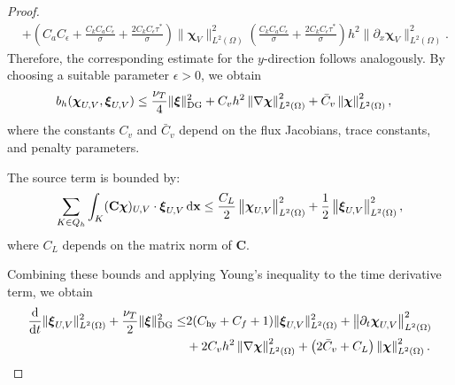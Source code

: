 \documentclass[pdflatex,sn-mathphys-num]{sn-jnl}%
\theoremstyle{thmstyleone}%
\theoremstyle{thmstyletwo}%
\theoremstyle{thmstylethree}%
\begin{document}
\begin{proof}
\begin{equation}
\begin{aligned}
& + \left( C_a C_\epsilon + \frac{C_k C_aC_\epsilon}{\sigma}+ \frac{2C_k C_\epsilon \tau^*}{\sigma}\right) \|\boldsymbol{\chi}_{V}\|_{L^2(\Omega)}^2 \left(\frac{C_k C_aC_\epsilon}{\sigma}+ \frac{2C_kC_\epsilon \tau^*}{\sigma} \right) h^2\|\partial_x \boldsymbol{\chi}_{V}\|_{L^2(\Omega)}^2.
\end{aligned}
\end{equation}
Therefore, the corresponding estimate for the $y$-direction follows analogously. By choosing a suitable parameter $\epsilon > 0$, we obtain
\begin{equation}\notag
\begin{aligned}
b_h(\boldsymbol{\chi}_{U,V}, \boldsymbol{\xi}_{U,V})
&\le \frac{\nu_T}{4} \|\boldsymbol{\xi}\|_{\mathrm{DG}}^2  + C_v h^{2}
\left\|\nabla \boldsymbol{\chi} \right\|^2_{L^2(\Omega)} + \bar{C}_v 
\left\|\boldsymbol{\chi} \right\|^2_{L^2(\Omega)},
\end{aligned}
\end{equation}
where the constants $C_v$ and $\bar{C}_v$ depend on the flux Jacobians, trace constants, and penalty parameters.

The source term is bounded by:
\begin{equation}\notag
\begin{aligned}
  \sum_{K \in Q_h} \int_K (\mathbf{C}\boldsymbol{\chi})_{U,V} \cdot \boldsymbol{\xi}_{U,V} \, \mathrm{d} \mathbf{x} \le \frac{C_L}{2}\left\|\boldsymbol{\chi}_{U,V}\right\|_{L^2(\Omega)}^2 + \frac{1}{2}\left\|\boldsymbol{\xi}_{U,V}\right\|_{L^2(\Omega)}^2,
\end{aligned}
\end{equation}
where $C_{L}$ depends on the matrix norm of $\mathbf{C}$.

Combining these bounds and applying Young's inequality to the time derivative term, we obtain
\begin{equation}\notag
\begin{aligned}
\frac{\mathrm{d}}{\mathrm{d}t}\|\boldsymbol{\xi}_{U,V}\|_{L^2(\Omega)}^2
+ \frac{\nu_T}{2}\|\boldsymbol{\xi}\|_{\mathrm{DG}}^2 \le& 
2(C_{\mathrm{hy}}+ C_f + 1)\|\boldsymbol{\xi}_{U,V}\|_{L^2(\Omega)}^2 + \left\|\partial_t \boldsymbol{\chi}_{U,V}\right\|^2_{L^2(\Omega)} \\
&+ 2C_v h^{2}
\left\|\nabla \boldsymbol{\chi} \right\|^2_{L^2(\Omega)} + \left(2\bar{C}_v  + C_L\right)
\left\|\boldsymbol{\chi} \right\|^2_{L^2(\Omega)}.
\end{aligned}
\end{equation}


\end{proof}
\end{document}
